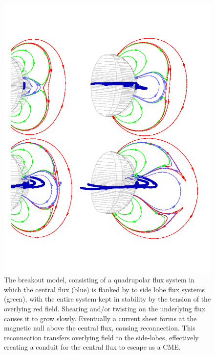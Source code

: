\begin{figure}[!t]
\begin{center}
\includegraphics[scale=0.5, trim=1cm 2cm 1cm 1cm]{images/Antiochos_breakout}
\caption{The breakout model, consisting of a quadrupolar flux system in which the central flux (blue) is flanked by to side lobe flux systems (green), with the entire system kept in stability by the tension of the overlying red field. Shearing and/or twisting on the underlying flux causes it to grow slowly. Eventually a current sheet forms at the magnetic null above the central flux, causing reconnection. This reconnection transfers overlying field to the side-lobes, effectively creating a conduit for the central flux to escape as a CME.}
\label{fig:breakout_model}
\end{center}
\end{figure}
